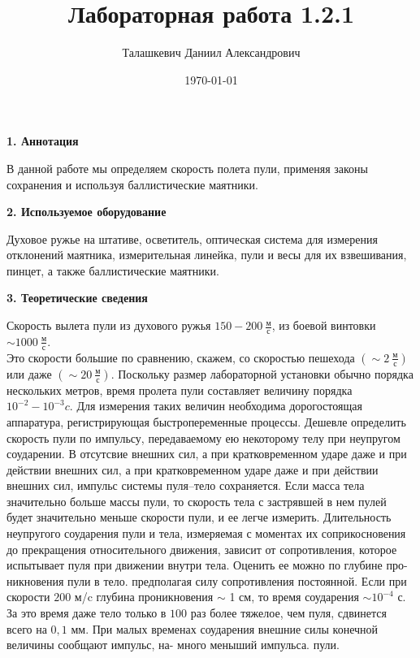 \documentclass[a4paper,12pt]{article} %
\author{Талашкевич Даниил Александрович}
\title{Лабораторная работа 1.2.1}
\date{\today}
\begin{document}
\maketitle
\thispagestyle{empty}

\newpage
\setcounter{page}{1}

\begin{center}
{\bf 1. Аннотация}
\end{center}

В данной работе мы определяем скорость полета пули, применяя законы сохранения и используя баллистические маятники.

\begin{center}
{\bf 2. Используемое оборудование}
\end{center}

Духовое ружье на штативе, осветитель, оптическая система для измерения отклонений маятника, измерительная линейка, пули и весы для их взвешивания, пинцет, а также баллистические маятники.

\begin{center}
{\bf 3. Теоретические сведения}
\end{center}

Скорость вылета пули из духового ружья $150-200 \ \frac{\textbf{м}}{\textbf{с}}$, из боевой винтовки $\sim 1000 \ \frac{\textbf{м}}{\textbf{с}}$.\\
Это скорости большие по сравнению, скажем, со скоростью пешехода $(\sim 2 \ \frac{\textbf{м}}{\textbf{с}})$ или даже $(\sim 20 \ \frac{\textbf{м}}{\textbf{с}})$. Поскольку размер лабораторной установки обычно порядка нескольких метров, время пролета пули составляет величину порядка $10^{-2} - 10^{-3} c.$ Для измерения таких величин необходима дорогостоящая аппаратура, регистрирующая быстропеременные процессы. Дешевле определить скорость пули по импульсу, передаваемому ею некоторому телу при неупругом соударении. В отсутсвие внешних сил, а при кратковременном ударе даже и при действии внешних сил, а при кратковременном ударе даже и при действии внешних сил, импульс системы пуля--тело сохраняется. Если масса тела значительно больше массы пули, то скорость тела с застрявшей в нем пулей будет значительно меньше скорости пули, и ее легче измерить. Длительность неупругого соударения пули и тела, измеряемая с моментах их соприкосновения до прекращения относительного движения, зависит от сопротивления, которое испытывает пуля при движении внутри тела. Оценить ее можно по глубине про-
никновения пули в тело. предполагая силу сопротивления постоянной.
Если при скорости $200$ м/c глубина проникновения $\sim$ 1 см, то время
соударения $\sim 10^{-4}$ с. За это время даже тело только в $100$ раз более
тяжелое, чем пуля, сдвинется всего на $0,1$ мм. При малых временах
соударения внешние силы конечной величины сообщают импульс, на-
много меныший импульса. пули.
\end{document}
